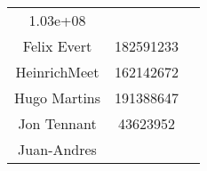\documentclass[]{article}
\begin{document}
\begin{longtable}[c]{@{}ccc@{}}
\begin{minipage}[t]{0.13\columnwidth}\centering\strut
1.03e+08
\strut\end{minipage} &
\begin{minipage}[t]{0.13\columnwidth}\centering\strut
\strut\end{minipage}\tabularnewline
\begin{minipage}[t]{0.24\columnwidth}\centering\strut
Felix Evert
\strut\end{minipage} &
\begin{minipage}[t]{0.13\columnwidth}\centering\strut
182591233
\strut\end{minipage} &
\begin{minipage}[t]{0.13\columnwidth}\centering\strut
\strut\end{minipage}\tabularnewline
\begin{minipage}[t]{0.24\columnwidth}\centering\strut
HeinrichMeet
\strut\end{minipage} &
\begin{minipage}[t]{0.13\columnwidth}\centering\strut
162142672
\strut\end{minipage} &
\begin{minipage}[t]{0.13\columnwidth}\centering\strut
\strut\end{minipage}\tabularnewline
\begin{minipage}[t]{0.24\columnwidth}\centering\strut
Hugo Martins
\strut\end{minipage} &
\begin{minipage}[t]{0.13\columnwidth}\centering\strut
191388647
\strut\end{minipage} &
\begin{minipage}[t]{0.13\columnwidth}\centering\strut
\strut\end{minipage}\tabularnewline
\begin{minipage}[t]{0.24\columnwidth}\centering\strut
Jon Tennant
\strut\end{minipage} &
\begin{minipage}[t]{0.13\columnwidth}\centering\strut
43623952
\strut\end{minipage} &
\begin{minipage}[t]{0.13\columnwidth}\centering\strut
\strut\end{minipage}\tabularnewline
\begin{minipage}[t]{0.24\columnwidth}\centering\strut
Juan-Andres
\strut\end{minipage} &
\begin{minipage}[t]{0.13\columnwidth}\centering\strut

\end{minipage}
\end{longtable}
\end{document}
